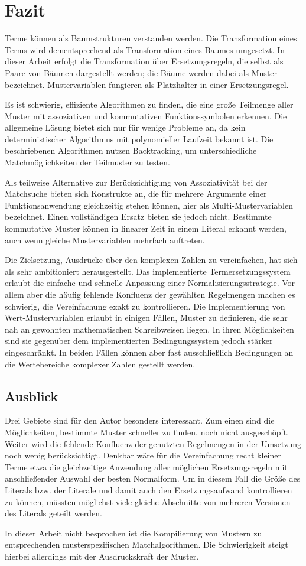 

\chapter{Fazit} \label{secZusammenfassung}
Terme können als Baumstrukturen verstanden werden. Die Transformation eines Terms wird dementsprechend als Transformation eines Baumes umgesetzt. In dieser Arbeit erfolgt die Transformation über Ersetzungsregeln, die selbst als Paare von Bäumen dargestellt werden; die Bäume werden dabei als Muster bezeichnet. Mustervariablen fungieren als Platzhalter in einer Ersetzungsregel.

Es ist schwierig, effiziente Algorithmen zu finden, die eine große Teilmenge aller Muster mit assoziativen und kommutativen Funktionssymbolen erkennen. Die allgemeine Lösung bietet sich nur für wenige Probleme an, da kein deterministischer Algorithmus mit polynomieller Laufzeit bekannt ist. 
Die beschriebenen Algorithmen nutzen Backtracking, um unterschiedliche Matchmöglichkeiten der Teilmuster zu testen. 

Als teilweise Alternative zur Berücksichtigung von Assoziativität bei der Matchsuche bieten sich Konstrukte an, die für mehrere Argumente einer Funktionsanwendung gleichzeitig stehen können, hier als Multi-Mustervariablen bezeichnet. Einen vollständigen Ersatz bieten sie jedoch nicht.
Bestimmte kommutative Muster können in linearer Zeit in einem Literal erkannt werden, auch wenn gleiche Mustervariablen mehrfach auftreten. 

Die Zielsetzung, Ausdrücke über den komplexen Zahlen zu vereinfachen, hat sich als sehr ambitioniert herausgestellt. Das implementierte Termersetzungssystem erlaubt die einfache und schnelle Anpassung einer Normalisierungsstrategie. Vor allem aber die häufig fehlende Konfluenz der gewählten Regelmengen machen es schwierig, die Vereinfachung exakt zu kontrollieren. 
Die Implementierung von Wert-Mustervariablen erlaubt in einigen Fällen, Muster zu definieren, die sehr nah an gewohnten mathematischen Schreibweisen liegen. In ihren Möglichkeiten sind sie gegenüber dem implementierten Bedingungssystem jedoch stärker eingeschränkt. In beiden Fällen können aber fast ausschließlich Bedingungen an die Wertebereiche komplexer Zahlen gestellt werden.

\section{Ausblick}
Drei Gebiete sind für den Autor besonders interessant. Zum einen sind die Möglichkeiten, bestimmte Muster schneller zu finden, noch nicht ausgeschöpft. Weiter wird die fehlende Konfluenz der genutzten Regelmengen in der Umsetzung noch wenig berücksichtigt. Denkbar wäre für die Vereinfachung recht kleiner Terme etwa die gleichzeitige Anwendung aller möglichen Ersetzungsregeln mit anschließender Auswahl der besten Normalform. Um in diesem Fall die Größe des Literals bzw. der Literale und damit auch den Ersetzungsaufwand kontrollieren zu können, müssten möglichst viele gleiche Abschnitte von mehreren Versionen des Literals geteilt werden. 

In dieser Arbeit nicht besprochen ist die Kompilierung von Mustern zu entsprechenden musterspezifischen Matchalgorithmen. Die Schwierigkeit steigt hierbei allerdings mit der Ausdruckskraft der Muster.






